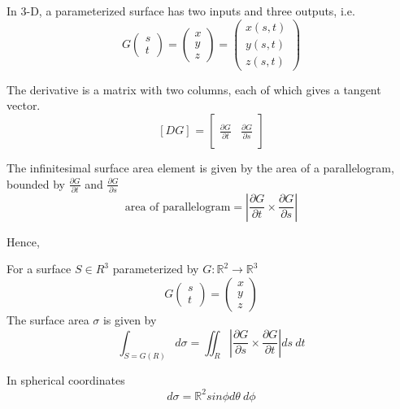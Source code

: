 In 3-D, a parameterized surface has two inputs and three outputs, i.e.
\[
  G \begin{pmatrix} s\\t \end{pmatrix}  = \begin{pmatrix} x \\ y \\ z \end{pmatrix}  = \begin{pmatrix} 
    x(s, t)  \\
    y(s, t)  \\
    z(s, t)  
  \end{pmatrix}
\] 

The derivative is a matrix with two columns, each of which gives a tangent vector.
\[
  \left[ D G \right]_{}  = \begin{bmatrix} 
     & \\
     \frac{\partial G}{\partial t} & \frac{\partial G}{\partial s} \\
                                   &
  \end{bmatrix}
\] 

The infinitesimal surface area element is given by the area of a parallelogram, bounded by $\frac{\partial G}{\partial t}$ and $\frac{\partial G}{\partial s}$
\[
   \text{area of parallelogram} = \left| \frac{\partial G}{\partial t} \times \frac{\partial G}{\partial s} \right| 
\] 

Hence,
\begin{framed}

   For a surface $S \in R^3$ parameterized by $ G : \mathbb{R}^2  \rightarrow \mathbb{R}^3 $
   \[
     G \begin{pmatrix} s \\t \end{pmatrix}  = \begin{pmatrix}  x \\ y \\z \end{pmatrix} 
   \] 
   The surface area $\sigma$ is given by
   \[
      \int_{S = G(R)} d \sigma = \iint_R \left| \frac{\partial G}{\partial s} \times \frac{\partial G}{\partial t} \right| ds\ dt
   \]  
  
\end{framed}


In spherical coordinates
\[
  d \sigma = \mathbb{R}^2 sin \phi d \theta\ d \phi
\]  


